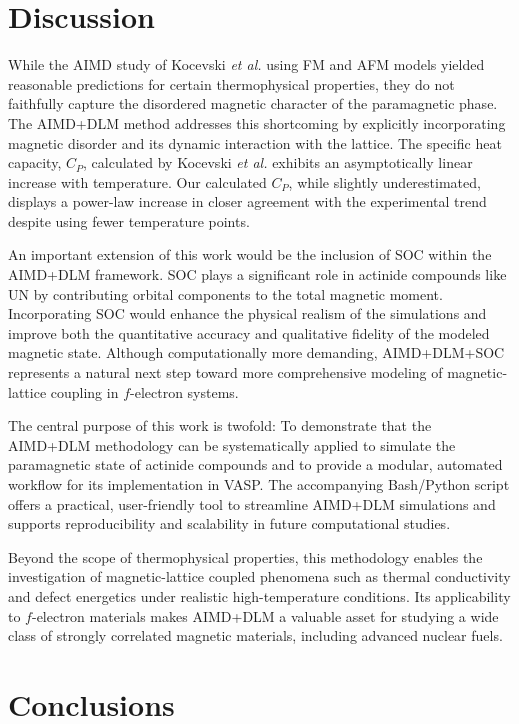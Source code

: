 \documentclass[preprint, 12pt]{elsarticle}
\newcommand{\?}{\stackrel{?}{=}}
\begin{document}
\section{Discussion}

While the AIMD study of Kocevski \textit{et al.} \cite{Kocevski2023} using FM and AFM models yielded reasonable predictions for certain thermophysical properties, they do not faithfully capture the disordered magnetic character of the paramagnetic phase. The AIMD+DLM method addresses this shortcoming by explicitly incorporating magnetic disorder and its dynamic interaction with the lattice. The specific heat capacity, $C_P$, calculated by Kocevski \textit{et al.} exhibits an asymptotically linear increase with temperature. Our calculated $C_P$, while slightly underestimated, displays a power-law increase in closer agreement with the experimental trend despite using fewer temperature points.

An important extension of this work would be the inclusion of SOC within the AIMD+DLM framework. SOC plays a significant role in actinide compounds like UN by contributing orbital components to the total magnetic moment. Incorporating SOC would enhance the physical realism of the simulations and improve both the quantitative accuracy and qualitative fidelity of the modeled magnetic state. Although computationally more demanding, AIMD+DLM+SOC represents a natural next step toward more comprehensive modeling of magnetic-lattice coupling in $f$-electron systems.

The central purpose of this work is twofold: To demonstrate that the AIMD+DLM methodology can be systematically applied to simulate the paramagnetic state of actinide compounds and to provide a modular, automated workflow for its implementation in VASP. The accompanying Bash/Python script offers a practical, user-friendly tool to streamline AIMD+DLM simulations and supports reproducibility and scalability in future computational studies.

Beyond the scope of thermophysical properties, this methodology enables the investigation of magnetic-lattice coupled phenomena such as thermal conductivity and defect energetics under realistic high-temperature conditions. Its applicability to $f$-electron materials makes AIMD+DLM a valuable asset for studying a wide class of strongly correlated magnetic materials, including advanced nuclear fuels.

\section{Conclusions}
\end{document}
